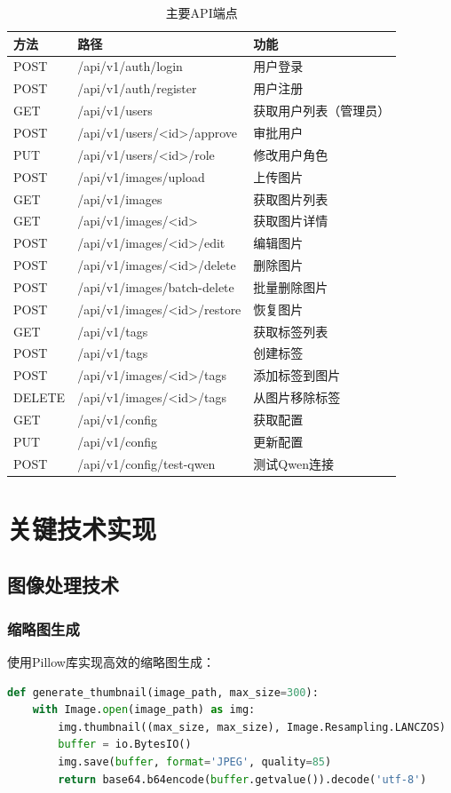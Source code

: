 \documentclass[12pt,a4paper]{article}
\begin{document}
\begin{table}[h]
\centering
\caption{主要API端点}
\begin{tabularx}{\textwidth}{|l|l|X|}
\hline
\textbf{方法} & \textbf{路径} & \textbf{功能} \\
\hline
POST & /api/v1/auth/login & 用户登录 \\
POST & /api/v1/auth/register & 用户注册 \\
GET & /api/v1/users & 获取用户列表（管理员） \\
POST & /api/v1/users/<id>/approve & 审批用户 \\
PUT & /api/v1/users/<id>/role & 修改用户角色 \\
POST & /api/v1/images/upload & 上传图片 \\
GET & /api/v1/images & 获取图片列表 \\
GET & /api/v1/images/<id> & 获取图片详情 \\
POST & /api/v1/images/<id>/edit & 编辑图片 \\
POST & /api/v1/images/<id>/delete & 删除图片 \\
POST & /api/v1/images/batch-delete & 批量删除图片 \\
POST & /api/v1/images/<id>/restore & 恢复图片 \\
GET & /api/v1/tags & 获取标签列表 \\
POST & /api/v1/tags & 创建标签 \\
POST & /api/v1/images/<id>/tags & 添加标签到图片 \\
DELETE & /api/v1/images/<id>/tags & 从图片移除标签 \\
GET & /api/v1/config & 获取配置 \\
PUT & /api/v1/config & 更新配置 \\
POST & /api/v1/config/test-qwen & 测试Qwen连接 \\
\hline
\end{tabularx}
\end{table}

\section{关键技术实现}

\subsection{图像处理技术}

\subsubsection{缩略图生成}
使用Pillow库实现高效的缩略图生成：
\begin{lstlisting}[language=Python]
def generate_thumbnail(image_path, max_size=300):
    with Image.open(image_path) as img:
        img.thumbnail((max_size, max_size), Image.Resampling.LANCZOS)
        buffer = io.BytesIO()
        img.save(buffer, format='JPEG', quality=85)
        return base64.b64encode(buffer.getvalue()).decode('utf-8')
\end{lstlisting}
\end{document}
